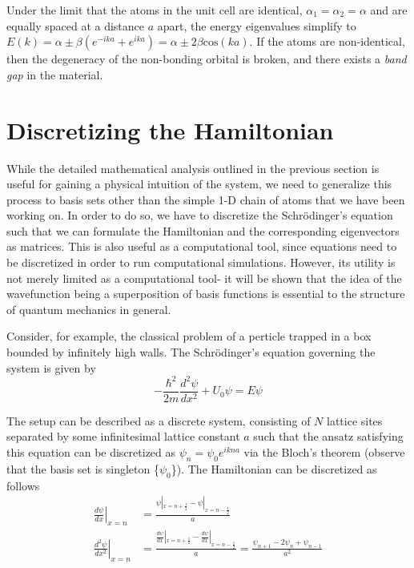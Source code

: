 Under the limit that the atoms in the unit cell are identical, $\alpha_{1} = \alpha_{2} = \alpha$ and are equally spaced at a distance $a$ apart, the energy eigenvalues simplify to $E(k) = \alpha \pm \beta (e^{-ika}+e^{ika}) = \alpha \pm 2\beta \text{cos}(ka)$. If the atoms are non-identical, then the degeneracy of the non-bonding orbital is broken, and there exists a \textit{band gap} in the material. 


\section{Discretizing the Hamiltonian}

While the detailed mathematical analysis outlined in the previous section is useful for gaining a physical intuition of the system, we need to generalize this process to basis sets other than the simple 1-D chain of atoms that we have been working on. In order to do so, we have to discretize the Schrödinger's equation such that we can formulate the Hamiltonian and the corresponding eigenvectors as matrices. This is also useful as a computational tool, since equations need to be discretized in order to run computational simulations. However, its utility is not merely limited as a computational tool- it will be shown that the idea of the wavefunction being a superposition of basis functions is essential to the structure of quantum mechanics in general. \par

Consider, for example, the classical problem of a perticle trapped in a box bounded by infinitely high walls. The Schrödinger's equation governing the system is given by
\begin{equation*}
    -\frac{\hbar^2}{2m}\frac{d^2 \psi}{dx^2} + U_0 \psi = E \psi
\end{equation*} 

The setup can be described as a discrete system, consisting of $N$ lattice sites separated by some infinitesimal lattice constant $a$ such that the ansatz satisfying this equation can be discretized as $\psi_{n} = \psi_{0}e^{ikna}$ via the Bloch's theorem (observe that the basis set is singleton \{$\psi_0$\}). The Hamiltonian can be discretized as follows
\begin{equation*}
\begin{aligned}
    \left.\frac{d\psi}{dx}\right|_{x=n} &= \frac{\psi|_{x=n+\frac{1}{2}}-\psi|_{x=n-\frac{1}{2}}}{a} \\
    \left.\frac{d^2 \psi}{dx^2}\right|_{x=n} &= \frac{\frac{d\psi}{dx}|_{x=n+\frac{1}{2}}-\frac{d\psi}{dx}|_{x=n-\frac{1}{2}}}{a} = \frac{\psi_{n+1}-2\psi_{n}+\psi_{n-1}}{a^2}
\end{aligned}
\end{equation*}


